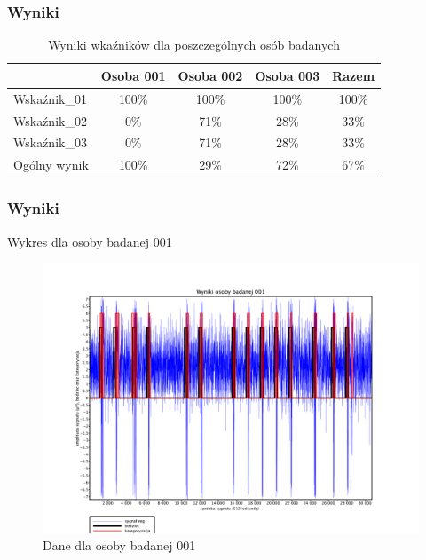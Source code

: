 \documentclass{beamer}
\begin{document}
\begin{frame}
\frametitle{Wyniki}
    \begin{table}[H]
        \caption {Wyniki wkaźników dla poszczególnych osób badanych}
        \begin{center}
            \hspace*{-0.5cm}
            \begin{tabular}{| p{2.5cm} || c | c | c || c |}
                \hline
                 & Osoba 001 & Osoba 002 & Osoba 003 & Razem \\
                \hline
                \hline
                Wskaźnik\_01 & 100\% & 100\% & 100\% & 100\% \\
                \hline
                Wskaźnik\_02 &   0\% &  71\% &  28\% &  33\% \\
                \hline
                Wskaźnik\_03 &   0\% &  71\% &  28\% &  33\% \\
                \hline
                \hline
                Ogólny wynik & 100\% &  29\% &  72\% &  67\% \\
                \hline
            \end{tabular}
        \end{center}
    \end{table}
\end{frame}

\begin{frame}
\frametitle{Wyniki}
    \begin{table}[H]
        \caption {Wykres dla osoby badanej 001}
        \begin{center}
            \begin{figure}[H]
                \hspace*{-3cm} 
                \includegraphics[width=\linewidth+20cm]{../plotting_data/scilab_eeg_01_sub_001.pdf}
                \caption{Dane dla osoby badanej 001}
            \end{figure}
        \end{center}
    \end{table}
\end{frame}
\end{document}
